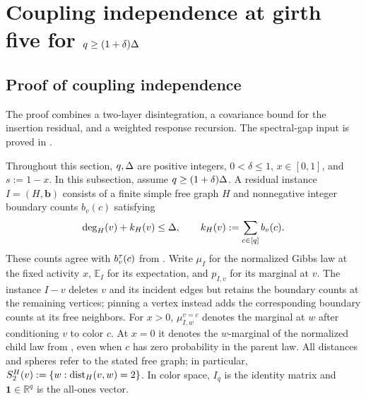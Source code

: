 \section{\texorpdfstring{Coupling independence at girth five for $q\ge(1+\delta)\Delta$}{Coupling independence at girth five for q >= (1+delta) Delta}}
\label{app:girth5-covariance}\label{sec:girth5-ci}

\subsection{Proof of coupling independence}

The proof combines a two-layer disintegration, a covariance bound for the
insertion residual, and a weighted response recursion.  The spectral-gap
input is proved in .

Throughout this section, $q,\Delta$ are positive integers,
$0<\delta\le1$, $x\in[0,1]$, and $s:=1-x$.
In this subsection, assume $q\ge(1+\delta)\Delta$.
A residual instance $I=(H,\mathbf b)$ consists of a finite simple free
graph $H$ and nonnegative integer boundary counts $b_v(c)$ satisfying
\begin{equation}\label{eq:girth5-degree-budget}
 \deg_H(v)+k_H(v)\le\Delta,
 \qquad k_H(v):=\sum_{c\in[q]}b_v(c).
\end{equation}
These counts agree with $b_v^\tau(c)$ from .  Write
$\mu_I$ for the normalized Gibbs law at the fixed activity $x$,
$\mathbb E_I$ for its expectation, and $p_{I,v}$ for its marginal at $v$.
The instance $I-v$ deletes $v$ and its incident edges but retains the
boundary counts at the remaining vertices; pinning a vertex instead adds
the corresponding boundary counts at its free neighbors.
For $x>0$, $\mu_{I,w}^{v=c}$ denotes the marginal at $w$ after conditioning
$v$ to color $c$.  At $x=0$ it denotes the $w$-marginal of the
normalized child law from , even when $c$ has zero probability
in the parent law.  All distances and spheres refer to the stated free
graph; in particular, $S_2^H(v):=\{w:\operatorname{dist}_H(v,w)=2\}$.
In color space, $I_q$ is the identity matrix and
$\mathbf1\in\mathbb R^q$ is the all-ones vector.

